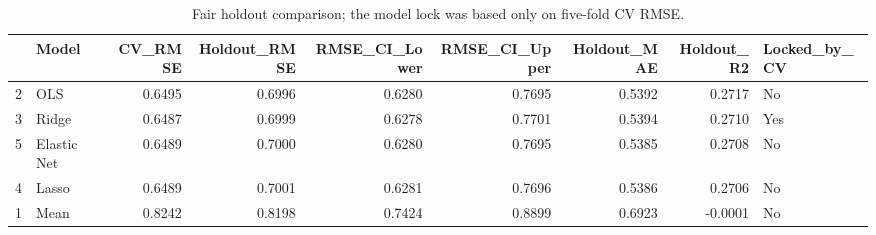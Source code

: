 \begin{table}

\caption{\label{tab:p5-holdout-display}Fair holdout comparison; the model lock was based only on five-fold CV RMSE.}
\centering
\begin{tabular}[t]{llrrrrrrl}
\toprule
  & Model & CV\_RMSE & Holdout\_RMSE & RMSE\_CI\_Lower & RMSE\_CI\_Upper & Holdout\_MAE & Holdout\_R2 & Locked\_by\_CV\\
\midrule
2 & OLS & 0.6495 & 0.6996 & 0.6280 & 0.7695 & 0.5392 & 0.2717 & No\\
3 & Ridge & 0.6487 & 0.6999 & 0.6278 & 0.7701 & 0.5394 & 0.2710 & Yes\\
5 & Elastic Net & 0.6489 & 0.7000 & 0.6280 & 0.7695 & 0.5385 & 0.2708 & No\\
4 & Lasso & 0.6489 & 0.7001 & 0.6281 & 0.7696 & 0.5386 & 0.2706 & No\\
1 & Mean & 0.8242 & 0.8198 & 0.7424 & 0.8899 & 0.6923 & -0.0001 & No\\
\bottomrule
\end{tabular}
\end{table}

